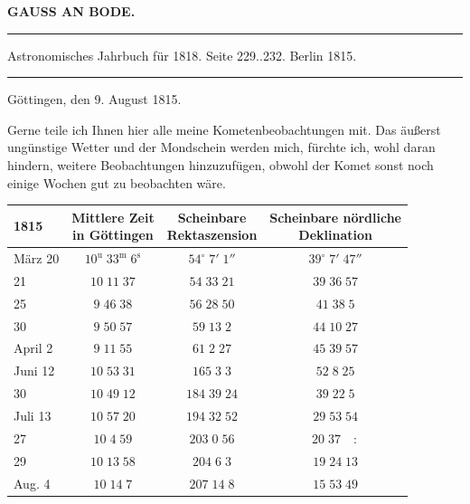 \clearpage{}\hypertarget{native-392-lower}{}\label{native-392-lower}
\begin{center}\textbf{GAUSS AN BODE.}\par\vspace{4pt}\hrule\vspace{4pt}\fontsize{10}{12}\selectfont Astronomisches Jahrbuch für 1818. Seite 229..232. Berlin 1815.\par\vspace{4pt}\hrule\vspace{4pt}\end{center}

\begin{flushright}
Göttingen, den 9. August 1815.
\end{flushright}

\par\indent Gerne teile ich Ihnen hier alle meine Kometenbeobachtungen mit. Das äußerst ungünstige Wetter und der Mondschein werden mich, fürchte ich, wohl daran hindern, weitere Beobachtungen hinzuzufügen, obwohl der Komet sonst noch einige Wochen gut zu beobachten wäre.

\begin{center}\fontsize{10}{12}\selectfont\setlength{\tabcolsep}{5pt}\renewcommand{\arraystretch}{1.15}\begin{tabular}{l|c|c|c}
1815 & \shortstack{Mittlere Zeit\\in Göttingen} & \shortstack{Scheinbare\\Rektaszension} & \shortstack{Scheinbare nördliche\\Deklination}\\\hline
März 20 & $10^{\mathrm u}\;33^{\mathrm m}\;6^{\mathrm s}$ & $54^\circ\;7'\;1''$ & $39^\circ\;7'\;47''$\\
21 & $10\;11\;37$ & $54\;33\;21$ & $39\;36\;57$\\
25 & $9\;46\;38$ & $56\;28\;50$ & $41\;38\;5$\\
30 & $9\;50\;57$ & $59\;13\;2$ & $44\;10\;27$\\
April 2 & $9\;11\;55$ & $61\;2\;27$ & $45\;39\;57$\\
Juni 12 & $10\;53\;31$ & $165\;3\;3$ & $52\;8\;25$\\
30 & $10\;49\;12$ & $184\;39\;24$ & $39\;22\;5$\\
Juli 13 & $10\;57\;20$ & $194\;32\;52$ & $29\;53\;54$\\
27 & $10\;4\;59$ & $203\;0\;56$ & $20\;37\quad:$\\
29 & $10\;13\;58$ & $204\;6\;3$ & $19\;24\;13$\\
Aug. 4 & $10\;14\;7$ & $207\;14\;8$ & $15\;53\;49$\\
\end{tabular}\end{center}

